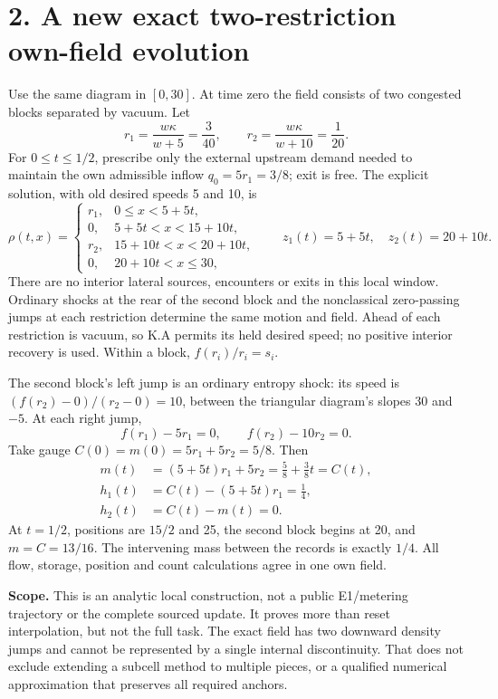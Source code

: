 \documentclass[11pt,a4paper]{article}
\begin{document}
\newpage
\section*{2. A new exact two-restriction own-field evolution}
Use the same diagram in $[0,30]$. At time zero the field consists of two
congested blocks separated by vacuum. Let
\begin{equation}
 r_1=\frac{w\kappa}{w+5}=\frac3{40},\qquad
 r_2=\frac{w\kappa}{w+10}=\frac1{20}.
\end{equation}
For $0\le t\le1/2$, prescribe only the external upstream demand needed to
maintain the own admissible inflow $q_0=5r_1=3/8$; exit is free. The explicit
solution, with old desired speeds 5 and 10, is
\begin{equation}
 \rho(t,x)=\begin{cases}
 r_1,&0\le x<5+5t,\\
 0,&5+5t<x<15+10t,\\
 r_2,&15+10t<x<20+10t,\\
 0,&20+10t<x\le30,
 \end{cases}\qquad
 z_1(t)=5+5t,\quad z_2(t)=20+10t.
\end{equation}
There are no interior lateral sources, encounters or exits in this local
window. Ordinary shocks at the rear of the second block and the nonclassical
zero-passing jumps at each restriction determine the same motion and field.
Ahead of each restriction is vacuum, so K.A permits its held desired speed;
no positive interior recovery is used. Within a block, $f(r_i)/r_i=s_i$.

The second block's left jump is an ordinary entropy shock: its speed is
$(f(r_2)-0)/(r_2-0)=10$, between the triangular diagram's slopes 30 and $-5$.
At each right jump,
\begin{equation}
 f(r_1)-5r_1=0,\qquad f(r_2)-10r_2=0.
\end{equation}
Take gauge $C(0)=m(0)=5r_1+5r_2=5/8$. Then
\begin{align}
 m(t)&=(5+5t)r_1+5r_2=\frac58+\frac38t=C(t),\\
 h_1(t)&=C(t)-(5+5t)r_1=\frac14,\\
 h_2(t)&=C(t)-m(t)=0.
\end{align}
At $t=1/2$, positions are $15/2$ and 25, the second block begins at 20,
and $m=C=13/16$. The intervening mass between the records is exactly $1/4$.
All flow, storage, position and count calculations agree in one own field.

\textbf{Scope.} This is an analytic local construction, not a public
E1/metering trajectory or the complete sourced update. It proves more than
reset interpolation, but not the full task. The exact field has two downward
density jumps and cannot be represented by a single internal discontinuity.
That does not exclude extending a subcell method to multiple pieces, or a
qualified numerical approximation that preserves all required anchors.
\end{document}
